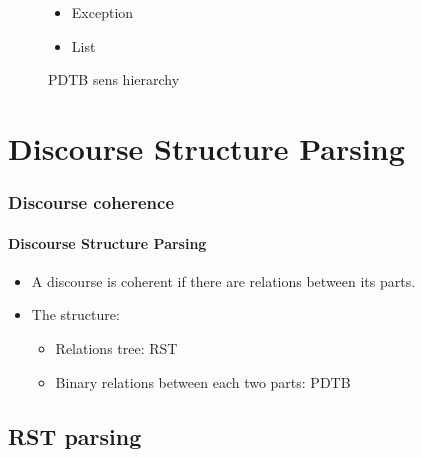 \documentclass[xcolor=table]{beamer}
\begin{document}
\begin{frame}
\begin{figure}
\begin{tcolorbox}[colback=white, colframe=blue, boxrule=1pt, text width=.9\textwidth]
\begin{minipage}{.3\textwidth}
\begin{itemize}
\begin{itemize}
\begin{itemize}
						\item Conjunction
						\item Disjunction
						\item Chosen Alternative
					\end{itemize}
					\item Exception
					\item List
				\end{itemize}
			\end{itemize}
		\end{minipage}\vspace{-6pt}
		\end{tcolorbox}\vspace{-6pt}
		\caption{PDTB sens hierarchy \cite{2008-prasad-al}}
	\end{figure}
	
\end{frame}

\section{Discourse Structure Parsing}

\begin{frame}
	\frametitle{Discourse coherence}
	\framesubtitle{Discourse Structure Parsing}
	
	\begin{itemize}
		\item A discourse is coherent if there are relations between its parts.
		\item The structure:
		\begin{itemize}
			\item Relations tree: RST
			\item Binary relations between each two parts: PDTB
		\end{itemize}
	\end{itemize}
	
\end{frame}

\subsection{RST parsing}
\end{document}

